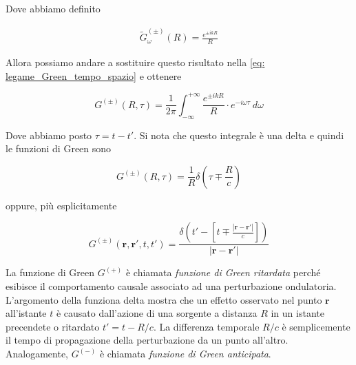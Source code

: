 Dove abbiamo definito 

\begin{tcolorbox}[colback=yellow!10!white, colframe=orange!70!black, boxrule=0.8pt]
\begin{align} 
    \tilde{G}_{\omega}^{(\pm)}(R) = \frac{e^{\pm i k R}}{R} 
\end{align}
\end{tcolorbox}

Allora possiamo andare a sostituire questo risultato nella \ref{eq: legame_Green_tempo_spazio} e ottenere

\begin{equation}
    G^{(\pm)} (R, \tau) = \frac{1}{2\pi} \int_{-\infty}^{+\infty} \frac{e^{\pm ikR}}{R} \cdot e^{-i\omega \tau} \ d\omega
\end{equation}

Dove abbiamo posto $\tau = t - t'$. Si nota che questo integrale è una delta e quindi le funzioni di Green sono 

\begin{equation}
    G^{(\pm)}(R, \tau) = \frac{1}{R} \delta(\tau \mp \frac{R}{c}) 
\end{equation}

oppure, più esplicitamente

\begin{tcolorbox}[colback=yellow!10!white, colframe=orange!70!black, boxrule=0.8pt]
\begin{equation}
    G^{(\pm)}(\mathbf{r}, \mathbf{r'}, t, t') = \frac{\delta \left(t' - \left[ t \mp \frac{|\mathbf{r} - \mathbf{r}'|}{c} \right] \right)}{|\mathbf{r} - \mathbf{r'}|}
\end{equation}
\end{tcolorbox}

La funzione di Green $G^{(+)}$ è chiamata \emph{funzione di Green ritardata}  perché esibisce il comportamento causale associato ad una perturbazione ondulatoria.
L'argomento della funziona delta mostra che un effetto osservato nel punto $\mathbf{r}$ all'istante $t$ è causato dall'azione di una sorgente a distanza $R$ in un istante precendete o ritardato $t' = t - R/c$. La differenza temporale $R/c$ è semplicemente il tempo di propagazione della perturbazione da un punto all'altro. \\

Analogamente, $G^{(-)}$ è chiamata \emph{funzione di Green anticipata}. \\

